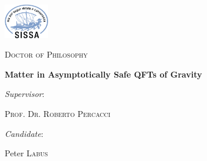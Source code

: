 \documentclass[12pt,a4paper]{report}
\begin{document}
\begin{titlepage}
  \begin{center}
    \vspace{1cm}

    \includegraphics[height=1.5cm]{sissa_logo.jpg} \hfill

    \vspace{2cm}

    {\scshape\LARGE Doctor of Philosophy \par}

    \vspace{3.5cm}

    {\huge\bfseries Matter in Asymptotically Safe QFTs of Gravity}

  \end{center}

  \vspace{2cm}

  \vfill

  \textit{Supervisor}:\par
  \textsc{Prof. Dr. Roberto Percacci}%
  \vspace{1cm}

  \begin{flushright}
    \textit{Candidate}:\par
    Peter \textsc{Labus}
  \end{flushright}
  \vfill

  \centering

\end{titlepage}
\end{document}
